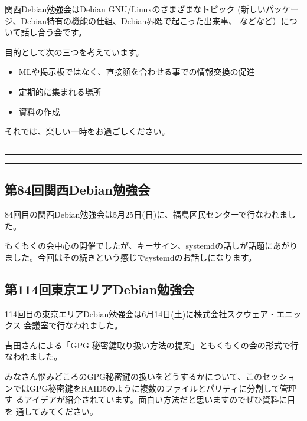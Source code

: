\documentclass[mingoth,a4paper]{jsarticle}
\begin{document}
 関西Debian勉強会はDebian GNU/Linuxのさまざまなトピック
 (新しいパッケージ、Debian特有の機能の仕組、Debian界隈で起こった出来事、
 などなど）について話し合う会です。

 目的として次の三つを考えています。
 \begin{itemize}
  \item MLや掲示板ではなく、直接顔を合わせる事での情報交換の促進
  \item 定期的に集まれる場所
  \item 資料の作成
 \end{itemize}

 それでは、楽しい一時をお過ごしください。

\newpage

\begin{minipage}[b]{0.2\hsize}
 {}
\end{minipage}
\begin{minipage}[b]{0.8\hsize}
\hrule
\vspace{2mm}
\hrule
\setcounter{tocdepth}{1}
\tableofcontents
\vspace{2mm}
\hrule
\end{minipage}


\subsection{第84回関西Debian勉強会}

84回目の関西Debian勉強会は5月25日(日)に、福島区民センターで行なわれまし
た。

もくもくの会中心の開催でしたが、キーサイン、systemdの話しが話題にあがり
ました。今回はその続きという感じでsystemdのお話しになります。

\subsection{第114回東京エリアDebian勉強会}

114回目の東京エリアDebian勉強会は6月14日(土)に株式会社スクウェア・エニッ
クス 会議室で行なわれました。

吉田さんによる「GPG 秘密鍵取り扱い方法の提案」ともくもくの会の形式で行
なわれました。

みなさん悩みどころのGPG秘密鍵の扱いをどうするかについて、このセッショ
ンではGPG秘密鍵をRAID5のように複数のファイルとパリティに分割して管理す
るアイデアが紹介されています。面白い方法だと思いますのでぜひ資料に目を
通してみてください。
\end{document}

